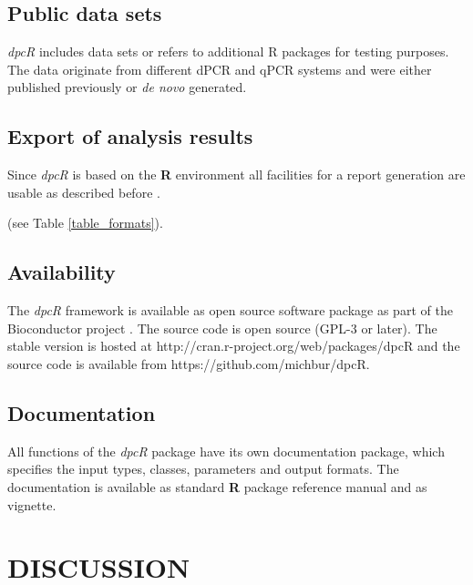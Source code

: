 \documentclass[a4,center,fleqn]{NAR}
\begin{document}
\subsection{Public data sets}

\textit{dpcR} includes data sets or refers to additional R packages for testing 
purposes. The data originate from different dPCR and qPCR systems and were 
either published previously \cite{whale_comparison_2012, 
rodiger_chippcr_2015, white_digital_2009, rodiger_r_2015} or \textit{de novo} generated.

\subsection{Export of analysis results}

Since \textit{dpcR} is based on the \textbf{R} environment all facilities for a 
report generation are usable as described before \cite{rodiger_r_2015}.

(see Table \ref{table_formats}).


\subsection{Availability}

The \textit{dpcR} framework is available as open source software package as part 
of the Bioconductor project \cite{gentleman_2004}. The source code is open 
source (GPL-3 or later). The stable version is hosted at 
http://cran.r-project.org/web/packages/dpcR and the source code is available 
from  https://github.com/michbur/dpcR.

\subsection{Documentation}

All functions of the \textit{dpcR} package have its own documentation package, 
which specifies the input types, classes, parameters and output formats. The 
documentation is available as standard \textbf{R} package reference manual and 
as vignette.

\section{DISCUSSION}
\end{document}
